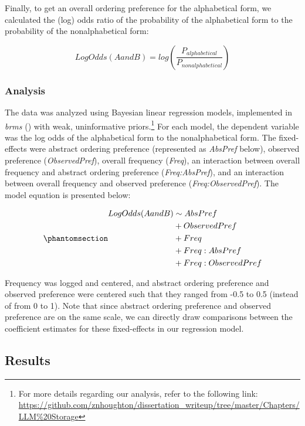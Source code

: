 \documentclass[
  12pt,
  letterpaper,
]{scrreprt}
\begin{document}
Finally, to get an overall ordering preference for the alphabetical
form, we calculated the (log) odds ratio of the probability of the
alphabetical form to the probability of the nonalphabetical form:

\[
LogOdds(AandB) = log(\frac{P_{alphabetical}}{P_{nonalphabetical}})
\]

\subsubsection{Analysis}\label{analysis-2}

The data was analyzed using Bayesian linear regression models,
implemented in \emph{brms}
() with
weak, uninformative priors.\footnote{For more details regarding our
  analysis, refer to the following link:
  \url{https://github.com/znhoughton/dissertation_writeup/tree/master/Chapters/LLM\%20Storage}}
For each model, the dependent variable was the log odds of the
alphabetical form to the nonalphabetical form. The fixed-effects were
abstract ordering preference (represented as \emph{AbsPref} below),
observed preference (\emph{ObservedPref}), overall frequency
(\emph{Freq}), an interaction between overall frequency and abstract
ordering preference (\emph{Freq:AbsPref}), and an interaction between
overall frequency and observed preference (\emph{Freq:ObservedPref}).
The model equation is presented below:

\begin{equation}\phantomsection\label{eq-model}{
\begin{aligned}
    LogOdds(AandB) & \sim AbsPref \\
      & + ObservedPref\\
      & + Freq\\
      & + Freq:AbsPref\\ 
      & + Freq:ObservedPref
\end{aligned}
}\end{equation}

\noindent Frequency was logged and centered, and abstract ordering
preference and observed preference were centered such that they ranged
from -0.5 to 0.5 (instead of from 0 to 1). Note that since abstract
ordering preference and observed preference are on the same scale, we
can directly draw comparisons between the coefficient estimates for
these fixed-effects in our regression model.

\subsection{Results}\label{results-5}
\end{document}
